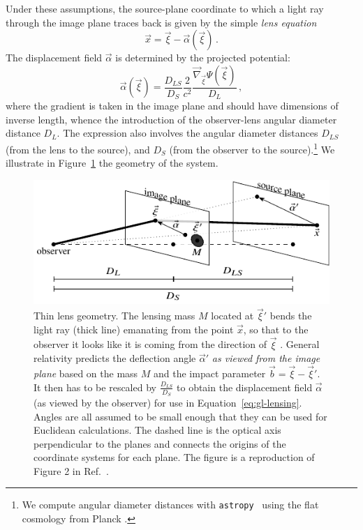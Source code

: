 Under these assumptions, the source-plane coordinate to which a light ray through the image plane traces back is given by the simple \emph{lens equation}
\begin{equation} \label{eq:gl-lensing}
    \vec{x} = \vec{\xi} - \vec{\alpha}(\vec{\xi}) \, .
\end{equation}
The displacement field $\vec\alpha$ is determined by the projected potential:
\begin{equation} \label{eq:disp_grad}
    \vec{\alpha}(\vec{\xi}) = \frac{D_{LS}}{D_S} \frac{2}{c^2} \frac{\vec{\nabla}_{\vec{\xi}} \Psi(\vec\xi)}{D_L} \, ,
\end{equation}
where the gradient is taken in the image plane and should have dimensions of inverse length, whence the introduction of the observer-lens angular diameter distance $D_L$. The expression also involves the angular diameter distances $D_{LS}$ (from the lens to the source), and $D_S$ (from the observer to the source).\footnote{
    We compute angular diameter distances with \texttt{astropy}~\cite{Astropy:2013muo,Astropy:2018wqo} using the flat cosmology from Planck \cite{Planck:2018vyg}.
} 
We illustrate in Figure~\ref{fig:gl-lensing} the geometry of the system.

\begin{figure}
    \centering
    \includegraphics[width=0.8\linewidth]{Figures/GL-lensing.pdf}
    \caption{Thin lens geometry. The lensing mass $M$ located at $\vec\xi'$ bends the light ray (thick line) emanating from the point $\vec x$, so that to the observer it looks like it is coming from the direction of $\vec\xi$ . General relativity predicts the deflection angle $\vec\alpha'$  \emph{as viewed from the image plane} based on the mass $M$ and the impact parameter $\vec b = \vec \xi - \vec \xi '$. It then has to be rescaled by $\frac{D_{LS}}{D_S}$ to obtain the displacement field $\vec\alpha$ (as viewed by the observer) for use in Equation~\eqref{eq:gl-lensing}. Angles are all assumed to be small enough that they can be used for Euclidean calculations. The dashed line is the optical axis perpendicular to the planes and connects the origins of the coordinate systems for each plane. The figure is a reproduction of Figure 2 in Ref.~\cite{Karchev:2021fro}.}
    \label{fig:gl-lensing}
\end{figure}

